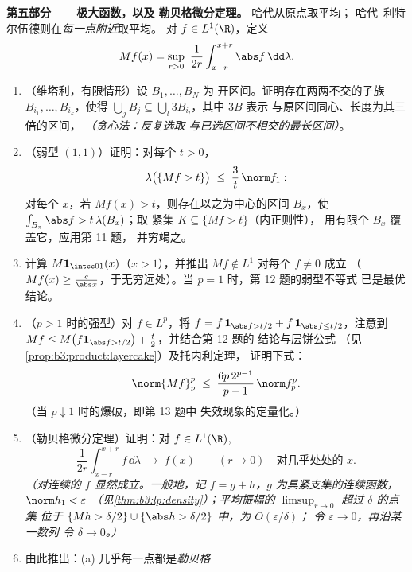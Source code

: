 \begin{problem}
\medskip
\noindent\textbf{第五部分——极大函数，以及
勒贝格微分定理。} 哈代从原点取平均；
哈代--利特尔伍德则在\emph{每一点附近}取平均。
对 $f \in L^1(\R)$，定义
\[
Mf(x) = \sup_{r>0}\ \frac1{2r}\int_{x-r}^{x+r}\abs
f\,\dd\lambda .
\]
\begin{enumerate}[resume]
  \item （维塔利，有限情形）设 $B_1, \dots, B_N$ 为
        开区间。证明存在两两不交的子族
        $B_{i_1}, \dots, B_{i_k}$，使得 $\bigcup_jB_j
        \subseteq \bigcup_l3B_{i_l}$，其中 $3B$ 表示
        与原区间同心、长度为其三倍的区间，
        \emph{（贪心法：反复选取
        与已选区间不相交的最长区间）}。
  \item （弱型 $(1,1)$）证明：对每个 $t > 0$，
        \[
        \lambda\bigl(\{Mf > t\}\bigr) \;\leq\;
        \frac3t\,\norm f_1 :
        \]
        对每个 $x$，若 $Mf(x) > t$，则存在以之为中心的区间
        $B_x$，使 $\int_{B_x}\abs f > t\,\lambda(B_x)$；取
        紧集 $K \subseteq \{Mf > t\}$（内正则性），
        用有限个 $B_x$ 覆盖它，应用第 11 题，
        并穷竭之。
  \item 计算 $M\mathbf 1_{\intcc01}(x)$（$x > 1$），并推出
        $Mf \notin L^1$ 对每个 $f \neq 0$ 成立
        （$Mf(x) \geq \frac c{\abs x}$，于无穷远处）。当 $p =
        1$ 时，第 12 题的弱型不等式
        已是最优结论。
  \item （$p > 1$ 时的强型）对 $f \in L^p$，将 $f =
        f\,\mathbf 1_{\abs f > t/2} + f\,\mathbf 1_{\abs f
        \leq t/2}$，注意到 $Mf \leq M\bigl(f\mathbf 1_{\abs
        f > t/2}\bigr) + \frac t2$，并结合第 12 题的
        结论与层饼公式
        （见\cref{prop:b3:product:layercake}）及托内利定理，
        证明下式：
        \[
        \norm{Mf}_p^p \;\leq\;
        \frac{6p\,2^{p-1}}{p-1}\,\norm f_p^p .
        \]
        （当 $p \downarrow 1$ 时的爆破，即第 13 题中
        失效现象的定量化。）
  \item （勒贝格微分定理）证明：对 $f \in
        L^1(\R)$,
        \[
        \frac1{2r}\int_{x-r}^{x+r}f\,\dd\lambda
        \;\longrightarrow\; f(x)
        \qquad (r \to 0)\quad\text{对几乎处处的\ }x .
        \]
        \emph{（对连续的 $f$ 显然成立。一般地，记 $f
        = g + h$，$g$ 为具紧支集的连续函数，
        $\norm h_1 < \varepsilon$
        （见\cref{thm:b3:lp:density}）；平均振幅的
        $\limsup_{r\to0}$ 超过 $\delta$ 的点集
        位于 $\{Mh > \delta/2\} \cup \{\abs h
        > \delta/2\}$ 中，为 $O(\varepsilon/\delta)$；
        令 $\varepsilon \to 0$，再沿某一数列
        令 $\delta \to 0$。）}
  \item 由此推出：(a) 几乎每一点都是\emph{勒贝格
}
\end{enumerate}
\end{problem}
